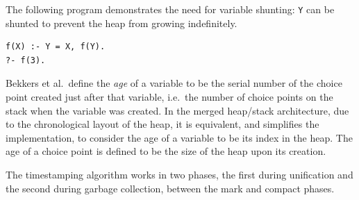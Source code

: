 The following program demonstrates the need for variable shunting: \texttt{Y} can be shunted to prevent the heap from growing indefinitely.

\begin{center}
\begin{verbatim}
f(X) :- Y = X, f(Y).
?- f(3).
\end{verbatim}
\end{center}

Bekkers et al.\ define the \emph{age} of a variable to be the serial number of the choice point created just after that variable, i.e.\ the number of choice points on the stack when the variable was created. In the merged heap/stack architecture, due to the chronological layout of the heap, it is equivalent, and simplifies the implementation, to consider the age of a variable to be its index in the heap. The age of a choice point is defined to be the size of the heap upon its creation.

The timestamping algorithm works in two phases, the first during unification and the second during garbage collection, between the mark and compact phases.

